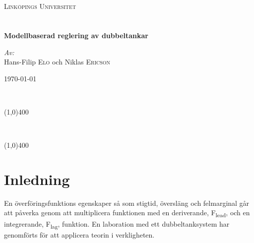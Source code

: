 \documentclass{article}
\begin{document}
\begin{titlepage}
\begin{center}


~\\
~\\
\textsc{\LARGE Link{\"o}pings Universitet}\\[1.5cm]


~\\
~\\
{ \huge \bfseries Modellbaserad reglering av dubbeltankar \\[0.4cm] }

\large
\emph{Av:}\\
Hans-Filip \textsc{Elo} och Niklas \textsc{Ericson}

\vfill

{\large \today}

\end{center}


\newpage
\thispagestyle{empty}
\tableofcontents
~\\

\begin{center}
\line(1,0){400}
\end{center}

\listoffigures
~\\

\begin{center}
\line(1,0){400}
\end{center}

\listoftables

\end{titlepage}
\pagestyle{fancy}

\fancyhead{} %
\fancyhead[R]{\today \slshape}

\fancyfoot{} %
\fancyfoot[L,R]{\thepage}



\section{Inledning}
En överföringsfunktions egenskaper så som stigtid, översläng och felmarginal går att påverka genom att multiplicera funktionen med en deriverande, F\textsubscript{lead}, och en integrerande, F\textsubscript{lag}, funktion. En laboration med ett dubbeltanksystem har genomförts för att applicera teorin i verkligheten.
\end{document}
